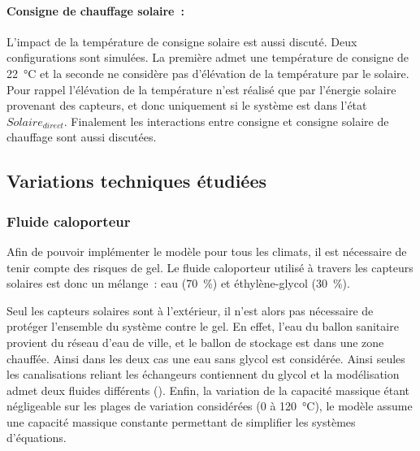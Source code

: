 \paragraph{Consigne de chauffage solaire~:} %
\label{par:consigne_de_chauffage_solaire}
L’impact de la température de consigne solaire est aussi discuté. Deux configurations sont
simulées. La première admet une température de consigne de \SI{22}{\celsius} et la seconde
ne considère pas d’élévation de la température par le solaire. Pour rappel l’élévation de
la température n’est réalisé que par l’énergie solaire provenant des capteurs, et donc
uniquement si le système est dans l’état $Solaire_{direct}$. Finalement les interactions
entre consigne et consigne solaire de chauffage sont aussi discutées.


\subsection{Variations techniques étudiées} %
\label{sub:variations_techniques_etudiees}
\subsubsection{Fluide caloporteur} %
\label{ssub:fluide_caloporteur}
Afin de pouvoir implémenter le modèle pour tous les climats, il est nécessaire de
tenir compte des risques de gel. Le fluide caloporteur utilisé à travers les capteurs
solaires est donc un mélange~: eau (\SI{70}{\percent}) et éthylène-glycol (\SI{30}{\percent}).

Seul les capteurs solaires sont à l’extérieur, il n’est alors pas nécessaire de protéger
l’ensemble du système contre le gel. En effet, l’eau du ballon sanitaire provient du
réseau d’eau de ville, et le ballon de stockage est dans une zone chauffée. Ainsi dans les
deux cas une eau sans glycol est considérée. Ainsi seules les canalisations reliant les
échangeurs contiennent du glycol et la modélisation admet deux fluides différents
(). Enfin, la variation de la capacité massique étant négligeable sur
les plages de variation considérées (\num{0} à \SI{120}{\celsius}), le modèle assume une
capacité massique constante permettant de simplifier les systèmes d’équations.

